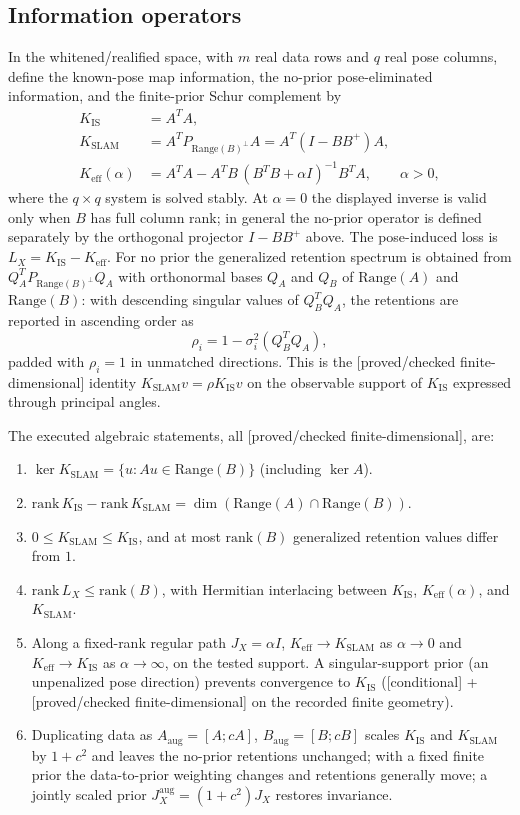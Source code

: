 \documentclass[12pt]{article}
\newcommand{\FDL}{\textnormal{[proved/checked finite-dimensional]}}
\newcommand{\CND}{\textnormal{[conditional]}}
\begin{document}
\subsection{Information operators}

In the whitened/realified space, with $m$ real data rows and $q$ real pose
columns, define the known-pose map information, the no-prior pose-eliminated
information, and the finite-prior Schur complement by
\begin{align}
K_{\mathrm{IS}}&=A^T A,\\
K_{\mathrm{SLAM}}&=A^T P_{\mathrm{Range}(B)^\perp}A
=A^T(I-BB^+)A,\\
K_{\mathrm{eff}}(\alpha)&=A^TA-A^TB\,(B^TB+\alpha I)^{-1}B^TA,
\qquad \alpha>0,
\end{align}
where the $q\times q$ system is solved stably. At $\alpha=0$ the displayed
inverse is valid only when $B$ has full column rank; in general the no-prior
operator is defined separately by the orthogonal projector $I-BB^+$ above.
The pose-induced loss is
$L_X=K_{\mathrm{IS}}-K_{\mathrm{eff}}$. For no prior the generalized retention
spectrum is obtained from $Q_A^T P_{\mathrm{Range}(B)^\perp}Q_A$ with
orthonormal bases $Q_A$ and $Q_B$ of $\mathrm{Range}(A)$ and
$\mathrm{Range}(B)$: with descending singular values of $Q_B^TQ_A$, the
retentions are reported in ascending order as
\[
\rho_i=1-\sigma_i^2(Q_B^TQ_A),
\]
padded with $\rho_i=1$ in unmatched directions. This is the
\FDL{} identity $K_{\mathrm{SLAM}}v=\rho K_{\mathrm{IS}}v$ on the observable
support of $K_{\mathrm{IS}}$ expressed through principal angles.

The executed algebraic statements, all \FDL{}, are:
\begin{enumerate}
\item $\ker K_{\mathrm{SLAM}}=\{u: Au\in \mathrm{Range}(B)\}$ (including
$\ker A$).
\item $\mathrm{rank}\,K_{\mathrm{IS}}-\mathrm{rank}\,K_{\mathrm{SLAM}}=
\dim(\mathrm{Range}(A)\cap\mathrm{Range}(B))$.
\item $0\le K_{\mathrm{SLAM}}\le K_{\mathrm{IS}}$, and at most
$\mathrm{rank}(B)$ generalized retention values differ from $1$.
\item $\mathrm{rank}\,L_X\le \mathrm{rank}(B)$, with Hermitian interlacing
between $K_{\mathrm{IS}}$, $K_{\mathrm{eff}}(\alpha)$, and $K_{\mathrm{SLAM}}$.
\item Along a fixed-rank regular path $J_X=\alpha I$, $K_{\mathrm{eff}}\to
K_{\mathrm{SLAM}}$ as $\alpha\to0$ and $K_{\mathrm{eff}}\to K_{\mathrm{IS}}$
as $\alpha\to\infty$, on the tested support. A singular-support prior (an
unpenalized pose direction) prevents convergence to $K_{\mathrm{IS}}$
(\CND{} + \FDL{} on the recorded finite geometry).
\item Duplicating data as $A_{\mathrm{aug}}=[A;cA]$,
$B_{\mathrm{aug}}=[B;cB]$ scales $K_{\mathrm{IS}}$ and $K_{\mathrm{SLAM}}$ by
$1+c^2$ and leaves the no-prior retentions unchanged; with a fixed finite
prior the data-to-prior weighting changes and retentions generally move; a
jointly scaled prior $J_X^{\mathrm{aug}}=(1+c^2)J_X$ restores invariance.
\end{enumerate}
\end{document}
